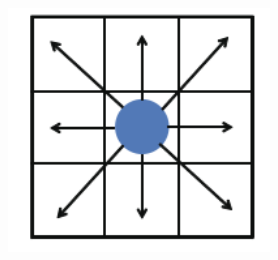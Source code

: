 \documentclass{beamer}
\begin{document}
\begin{frame}
\begin{columns}
\begin{column}{0.3\textwidth}
\begin{figure}
    \end{figure}
\end{column}
\begin{column}{0.2\textwidth}
   \begin{figure}
    \centering
        \includegraphics[width=1\textwidth]{nodal_analysis.png}
    \end{figure}
\end{column}
\end{columns}



\end{frame}
\end{document}

